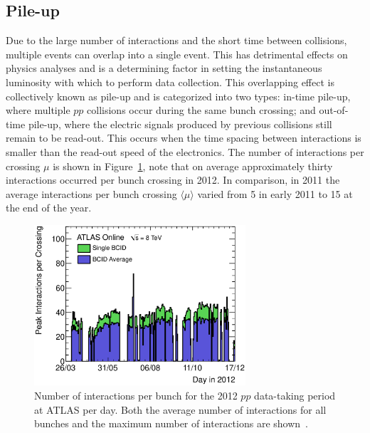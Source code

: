 \subsection{Pile-up}

Due to the large number of interactions and the short time between collisions, multiple events can overlap into a single event. This has detrimental effects on physics analyses and is a determining factor in setting the instantaneous luminosity with which to perform data collection. This overlapping effect is collectively known as pile-up and is categorized into two types: in-time pile-up, where multiple $pp$ collisions occur during the same bunch crossing; and out-of-time pile-up, where the electric signals produced by previous collisions still remain to be read-out. This occurs when the time spacing between interactions is smaller than the read-out speed of the electronics. The number of interactions per crossing $\mu$ is shown in Figure~\ref{fig:DetectorBunchCrossingInteractions}, note that on average approximately thirty interactions occurred per bunch crossing in 2012. In comparison, in 2011 the average interactions per bunch crossing $\langle\mu\rangle$ varied from 5 in early 2011 to 15 at the end of the year.

\begin{figure}[htbp]
  \centering
    \includegraphics[width=0.70\textwidth]{PartDetector/Plots/peakBothMuByDay.eps}
    \caption[Number of interactions per bunch for the 2012 $pp$ data-taking period at ATLAS per day.]{Number of interactions per bunch for the 2012 $pp$ data-taking period at ATLAS per day. Both the average number of interactions for all bunches and the maximum number of interactions are shown~\cite{Detector:LuminosityResults}.}
  \label{fig:DetectorBunchCrossingInteractions}
\end{figure}


